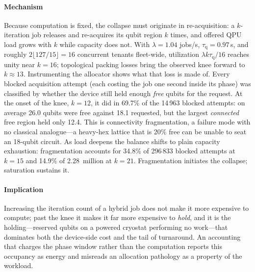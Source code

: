 \paragraph{Mechanism}
Because computation is fixed, the collapse must originate in re-acquisition:
a $k$-iteration job releases and re-acquires its qubit region $k$ times, and
offered QPU load grows with $k$ while capacity does not. With
$\lambda = 1.04$ jobs/s, $\tau_{\mathrm{q}} = 0.97$\,s, and roughly
$2\lfloor 127/15 \rfloor = 16$ concurrent tenants fleet-wide, utilization
$\lambda k \tau_{\mathrm{q}}/16$ reaches unity near $k=16$; topological
packing losses bring the observed knee forward to $k\approx13$. Instrumenting
the allocator shows what that loss is made of. Every blocked acquisition
attempt (each costing the job one second inside its phase) was classified by
whether the device still held enough \emph{free} qubits for the request. At
the onset of the knee, $k=12$, it did in 69.7\% of the 14\,963 blocked
attempts: on average 26.0 qubits were free against 18.1 requested, but the
largest \emph{connected} free region held only 12.4. This is connectivity
fragmentation, a failure mode with no classical analogue---a heavy-hex
lattice that is 20\% free can be unable to seat an 18-qubit circuit. As load
deepens the balance shifts to plain capacity exhaustion: fragmentation
accounts for 34.8\% of 296\,833 blocked attempts at $k=15$ and 14.9\% of
2.28~million at $k=21$. Fragmentation initiates the collapse; saturation
sustains it.

\paragraph{Implication}
Increasing the iteration count of a hybrid job does not make it more
expensive to compute; past the knee it makes it far more expensive to
\emph{hold}, and it is the holding---reserved qubits on a powered cryostat
performing no work---that dominates both the device-side cost and the tail
of turnaround. An accounting that charges the phase window rather than the
computation reports this occupancy as energy and misreads an allocation
pathology as a property of the workload.

